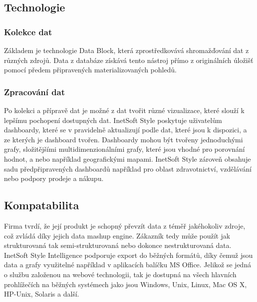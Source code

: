 \documentclass[czech,BP]{thesiskiv}
\begin{document}
\subsection{Technologie}
\subsubsection{Kolekce dat}
Základem je technologie Data Block\texttrademark, která zprostředkovává shromažďování dat z různých zdrojů. Data z databáze získává tento nástroj přímo z originálních úložišť pomocí předem připravených materializovaných pohledů.
\subsubsection{Zpracování dat}
Po kolekci a přípravě dat je možné z dat tvořit různé vizualizace, které slouží k lepšímu pochopení dostupných dat. InetSoft Style poskytuje uživatelům dashboardy, které se v pravidelně aktualizují podle dat, které jsou k dispozici, a ze kterých je dashboard tvořen. Dashboardy mohou být tvořeny jednoduchými grafy, složitějšími multidimenzionálními grafy, které jsou vhodné pro porovnání hodnot, a nebo například geografickými mapami. InetSoft Style zároveň obsahuje sadu předpřipravených dashboardů například pro oblast zdravotnictví, vzdělávání nebo podpory prodeje a nákupu. 


\subsection{Kompatabilita}
Firma tvrdí, že její produkt je schopný převzít data z téměř jakéhokoliv zdroje, což zvládá díky jejich data mashup engine. Zákazník tedy může použít jak strukturovaná tak semi-strukturovaná nebo dokonce nestrukturovaná data. InetSoft Style Intelligence podporuje export do běžných formátů, díky čemuž jsou data a grafy využitelné například v aplikacích balíčku MS Office. Jelikož se jedná o službu založenou na webové technologii, tak je dostupná na všech hlavních prohlížečích na běžných systémech jako jsou Windows, Unix, Linux, Mac OS X, HP-Unix, Solaris a další.\cite{InetKompatilbilita}
\end{document}
